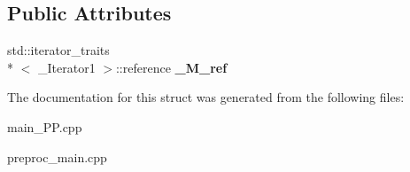 \subsection*{Public Attributes}
\begin{DoxyCompactItemize}
\item 
\hypertarget{struct____gnu__cxx_1_1____ops_1_1__Iter__equals__iter_aeb656675a58e23fa9532910e1401ec74}{std\+::iterator\+\_\+traits\\*
$<$ \+\_\+\+Iterator1 $>$\+::reference {\bfseries \+\_\+\+M\+\_\+ref}}\label{struct____gnu__cxx_1_1____ops_1_1__Iter__equals__iter_aeb656675a58e23fa9532910e1401ec74}

\end{DoxyCompactItemize}


The documentation for this struct was generated from the following files\+:\begin{DoxyCompactItemize}
\item 
main\+\_\+\+P\+P.\+cpp\item 
preproc\+\_\+main.\+cpp\end{DoxyCompactItemize}
